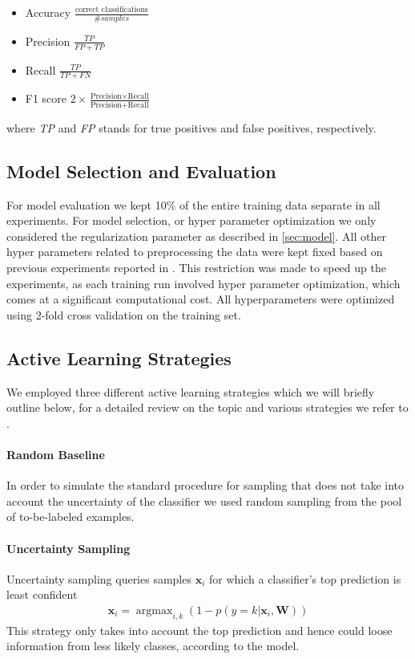 \documentclass[runningheads,a4paper]{article}
\renewcommand{\vec}[1]{\mathbf{#1}}
\DeclareMathOperator*{\argmax}{argmax}
\begin{document}
\begin{itemize}
\item Accuracy $\frac{\text{correct classifications}}{\# samples}$
\item Precision $\frac{TP} {FP + TP}$
\item Recall $\frac{TP}{TP + FN}$
\item F1 score $2\times \frac{\text{Precision} \times \text{Recall}}{\text{Precision} + \text{Recall}}$
\end{itemize}

where \textit{TP} and \textit{FP} stands for true positives and false positives, respectively.


\subsection{Model Selection and Evaluation}\label{sec:crossvalidation}
For model evaluation we kept 10\% of the entire training data separate in all experiments. For model selection, or hyper parameter optimization we only considered the regularization parameter as described in \autoref{sec:model}. All other hyper parameters related to preprocessing the data were kept fixed based on previous experiments reported in \cite{Biessmann16}. This restriction was made to speed up the experiments, as each training run involved hyper parameter optimization, which comes at a significant computational cost. All hyperparameters were optimized using 2-fold cross validation on the training set. 

\subsection{Active Learning Strategies}\label{sec:active_learning_strategies}
We employed three different active learning strategies which we will briefly outline below, for a detailed review on the topic and various strategies we refer to \cite{2012Settles}. 

\paragraph{Random Baseline} In order to simulate the standard procedure for sampling that does not take into account the uncertainty of the classifier we used random sampling from the pool of to-be-labeled examples. 

\paragraph{Uncertainty Sampling}
Uncertainty sampling queries samples $\vec{x}_i$ for which a classifier's top prediction is least confident
\begin{align}\label{eq:uncertainty_sampling}
\vec{x}_i = \argmax_{i,k} \left(1- p(y=k|\vec{x}_i,\vec{W})\right)
\end{align}
This strategy only takes into account the top prediction and hence could loose information from less likely classes, according to the model. 
\end{document}

